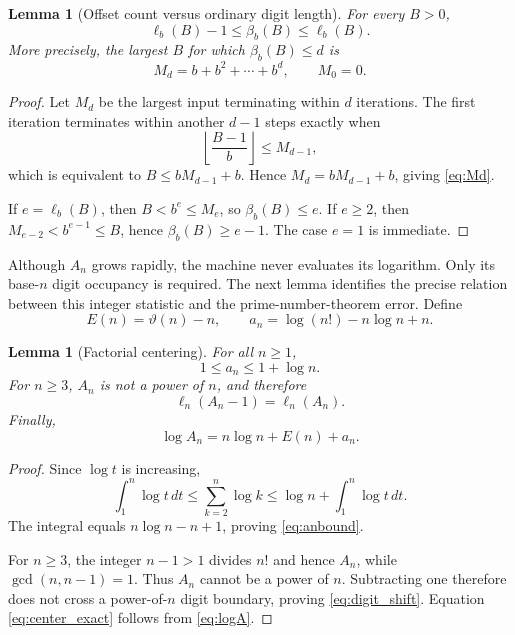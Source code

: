 \documentclass[10pt]{article}
\newtheorem{lemma}[theorem]{Lemma}
\theoremstyle{definition}
\newcommand{\tht}{\vartheta}
\begin{document}
\begin{lemma}[Offset count versus ordinary digit length]
\label{lem:beta}
For every $B>0$,
\[
\ell_b(B)-1\le\beta_b(B)\le\ell_b(B).
\]
More precisely, the largest $B$ for which $\beta_b(B)\le d$ is
\begin{equation}
\label{eq:Md}
M_d=b+b^2+\cdots+b^d,
\qquad M_0=0.
\end{equation}
\end{lemma}

\begin{proof}
Let $M_d$ be the largest input terminating within $d$ iterations. The first
iteration terminates within another $d-1$ steps exactly when
\[
\left\lfloor\frac{B-1}{b}\right\rfloor\le M_{d-1},
\]
which is equivalent to $B\le bM_{d-1}+b$. Hence $M_d=bM_{d-1}+b$, giving
\eqref{eq:Md}.

If $e=\ell_b(B)$, then $B<b^e\le M_e$, so $\beta_b(B)\le e$. If $e\ge2$, then
$M_{e-2}<b^{e-1}\le B$, hence $\beta_b(B)\ge e-1$. The case $e=1$ is
immediate.
\end{proof}

Although $A_n$ grows rapidly, the machine never evaluates its logarithm.
Only its base-$n$ digit occupancy is required. The next lemma identifies the
precise relation between this integer statistic and the prime-number-theorem
error. Define
\[
E(n)=\tht(n)-n,
\qquad
a_n=\log(n!)-n\log n+n.
\]

\begin{lemma}[Factorial centering]
\label{lem:center}
For all $n\ge1$,
\begin{equation}
\label{eq:anbound}
1\le a_n\le1+\log n.
\end{equation}
For $n\ge3$, $A_n$ is not a power of $n$, and therefore
\begin{equation}
\label{eq:digit_shift}
\ell_n(A_n-1)=\ell_n(A_n).
\end{equation}
Finally,
\begin{equation}
\label{eq:center_exact}
\log A_n=n\log n+E(n)+a_n.
\end{equation}
\end{lemma}

\begin{proof}
Since $\log t$ is increasing,
\[
\int_1^n\log t\,dt\le\sum_{k=2}^n\log k
\le \log n+\int_1^n\log t\,dt.
\]
The integral equals $n\log n-n+1$, proving \eqref{eq:anbound}.

For $n\ge3$, the integer $n-1>1$ divides $n!$ and hence $A_n$, while
$\gcd(n,n-1)=1$. Thus $A_n$ cannot be a power of $n$. Subtracting one
therefore does not cross a power-of-$n$ digit boundary, proving
\eqref{eq:digit_shift}. Equation \eqref{eq:center_exact} follows from
\eqref{eq:logA}.
\end{proof}
\end{document}
